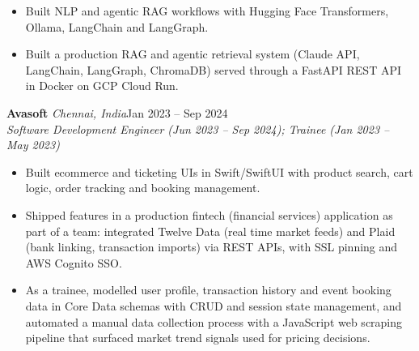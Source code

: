 \documentclass[a4paper,11pt]{article}
\newcommand{\role}[4]{%
  \textbf{#1}{\color{muted}\,\textperiodcentered\,\textit{#2}}\hfill{\color{muted}#3}\\
  \textit{#4}\par}
\newcommand{\gap}{\vspace{5pt}}
\begin{document}
\begin{itemize}
  \item Built NLP and agentic RAG workflows with Hugging Face Transformers, Ollama, LangChain and LangGraph.
  \item Built a production RAG and agentic retrieval system (Claude API, LangChain, LangGraph, ChromaDB) served through a FastAPI REST API in Docker on GCP Cloud Run.
\end{itemize}
\gap
{}
\role{Avasoft}{Chennai, India}{Jan 2023 – Sep 2024}{Software Development Engineer (Jun 2023 – Sep 2024); Trainee (Jan 2023 – May 2023)}
\begin{itemize}
  \item Built ecommerce and ticketing UIs in Swift/SwiftUI with product search, cart logic, order tracking and booking management.
  \item Shipped features in a production fintech (financial services) application as part of a team: integrated Twelve Data (real time market feeds) and Plaid (bank linking, transaction imports) via REST APIs, with SSL pinning and AWS Cognito SSO.
  \item As a trainee, modelled user profile, transaction history and event booking data in Core Data schemas with CRUD and session state management, and automated a manual data collection process with a JavaScript web scraping pipeline that surfaced market trend signals used for pricing decisions.
\end{itemize}
\end{document}
